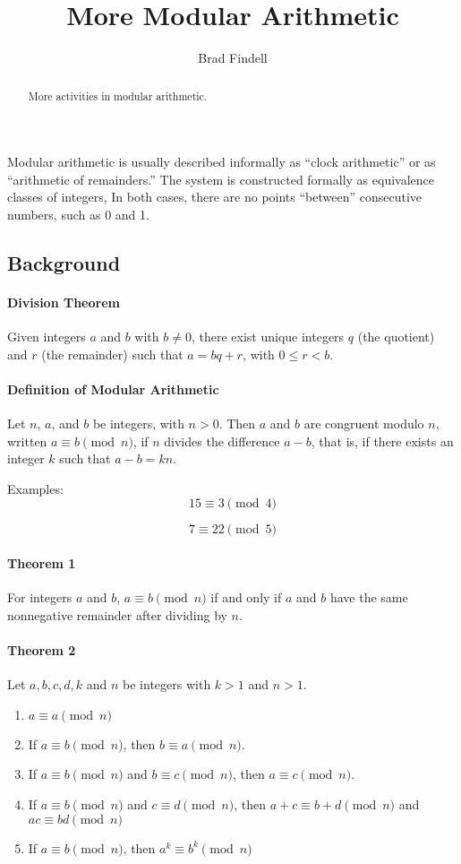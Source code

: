 \documentclass[space,nooutcomes]{ximera}
\title{More Modular Arithmetic}
\author{Brad Findell}
\begin{document}
\begin{abstract}
More activities in modular arithmetic.  
\end{abstract}
\maketitle


Modular arithmetic is usually described informally as ``clock arithmetic'' or as ``arithmetic of remainders.''  The system is constructed formally as equivalence classes of integers,   In both cases, there are no points ``between'' consecutive numbers, such as 0 and 1.  

\subsection*{Background}
\paragraph{Division Theorem} Given integers $a$ and $b$ with $b\neq 0$, there exist unique integers $q$ (the quotient) and $r$ (the remainder) such that $a = bq + r$, with $0 \leq r < b$.
 
\paragraph{Definition of Modular Arithmetic}  Let $n$, $a$, and $b$ be integers, with $n > 0$.  Then $a$ and $b$ are congruent modulo $n$, written $a\equiv b\pmod{n}$, if $n$ divides the difference $a-b$, that is, if there exists an integer $k$ such that $a-b = kn$.
  
Examples:  
$$15\equiv 3 \pmod{4}$$

$$7\equiv  22 \pmod{5}$$

\paragraph{Theorem 1}
For integers $a$ and $b$, $a\equiv b \pmod{n}$ if and only if $a$ and $b$ have the same nonnegative remainder after dividing by $n$.

\paragraph{Theorem 2}
Let $a, b, c, d, k$ and $n$ be integers with $k>1$ and $n > 1$.
\begin{enumerate}%
\item $a\equiv a \pmod{n}$
\item If $a\equiv b \pmod{n}$, then $b\equiv a \pmod{n}$.  
\item If $a\equiv b \pmod{n}$ and $b\equiv c \pmod{n}$, then $a\equiv c \pmod{n}$.
\item If $a\equiv b \pmod{n}$ and $c\equiv d \pmod{n}$, then $a+c\equiv b+d \pmod{n}$ and $ac\equiv bd \pmod{n}$
\item If $a\equiv b \pmod{n}$, then $a^k\equiv b^k \pmod{n}$
\end{enumerate}
\end{document}
